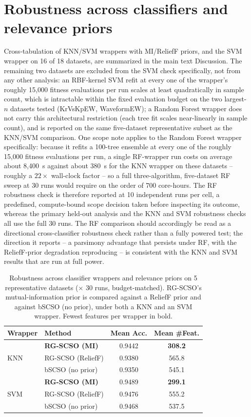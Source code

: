 \documentclass[9pt]{article}
\begin{document}
\FloatBarrier
\section{Robustness across classifiers and relevance priors}
Cross-tabulation of KNN/SVM wrappers with MI/ReliefF priors, and the SVM
wrapper on 16 of 18 datasets, are summarized in
the main text Discussion. The remaining two datasets are excluded from the
SVM check specifically, not from any other analysis: an RBF-kernel SVM
refit at every one of the wrapper's roughly 15{,}000 fitness evaluations
per run scales at least quadratically in sample count, which is intractable
within the fixed evaluation budget on the two largest-$n$ datasets tested
(KrVsKpEW, WaveformEW); a Random Forest wrapper does not carry this
architectural restriction (each tree fit scales near-linearly in sample
count), and is reported on the same five-dataset representative
subset as the KNN/SVM comparison. One scope note applies to the Random
Forest wrapper specifically: because it refits a 100-tree ensemble at every one
of the roughly 15{,}000 fitness evaluations per run, a single RF-wrapper run
costs on average about 8{,}400~s against about 380~s for the KNN wrapper on
these datasets -- roughly a $22\times$ wall-clock factor -- so a full
three-algorithm, five-dataset RF sweep at 30 runs would require on the order of
700 core-hours. The RF robustness check is therefore reported at 10 independent
runs per cell, a predefined, compute-bound scope decision taken before
inspecting its outcome, whereas the primary held-out analysis and the KNN and
SVM robustness checks all use the full 30 runs. The RF comparison should
accordingly be read as a directional cross-classifier robustness check rather
than a fully powered test; the direction it reports -- a parsimony advantage
that persists under RF, with the ReliefF-prior degradation reproducing -- is
consistent with the KNN and SVM results that are run at full power.

\begin{table}[t]
\centering
\caption{Robustness across classifier wrappers and relevance priors on 5 representative datasets ($\times$ 30 runs, budget-matched). RG-SCSO's mutual-information prior is compared against a ReliefF prior and against bSCSO (no prior), under both a KNN and an SVM wrapper. Fewest features per wrapper in bold.}
\label{tab:robustness}
\footnotesize
\begin{tabular}{llcc}
\toprule
Wrapper & Method & Mean Acc. & Mean \#Feat. \\
\midrule
\multirow{3}{*}{KNN} & \textbf{RG-SCSO (MI)} & 0.9442 & \textbf{308.2} \\
 & RG-SCSO (ReliefF) & 0.9380 & 565.8 \\
 & bSCSO (no prior) & 0.9350 & 545.1 \\
\midrule
\multirow{3}{*}{SVM} & \textbf{RG-SCSO (MI)} & 0.9489 & \textbf{299.1} \\
 & RG-SCSO (ReliefF) & 0.9476 & 555.2 \\
 & bSCSO (no prior) & 0.9468 & 537.5 \\
\bottomrule
\end{tabular}
\end{table}
\end{document}
